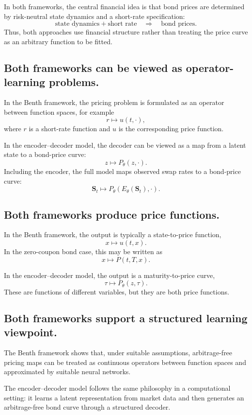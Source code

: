 In both frameworks, the central financial idea is that bond prices are determined by
risk-neutral state dynamics and a short-rate specification:
\[
    \text{state dynamics} + \text{short rate}
    \quad \Longrightarrow \quad
    \text{bond prices}.
\]
Thus, both approaches use financial structure rather than treating the price curve as
an arbitrary function to be fitted.

\subsection{Both frameworks can be viewed as operator-learning problems.}

In the Benth framework, the pricing problem is formulated as an operator between
function spaces, for example
\[
    r \longmapsto u(t,\cdot),
\]
where \(r\) is a short-rate function and \(u\) is the corresponding price function.

In the encoder--decoder model, the decoder can be viewed as a map from a latent state
to a bond-price curve:
\[
    z \longmapsto P_\theta(z,\cdot).
\]
Including the encoder, the full model maps observed swap rates to a bond-price curve:
\[
    \mathbf S_t
    \longmapsto
    P_\theta(E_\theta(\mathbf S_t),\cdot).
\]

\subsection{Both frameworks produce price functions.}

In the Benth framework, the output is typically a state-to-price function,
\[
    x \longmapsto u(t,x).
\]
In the zero-coupon bond case, this may be written as
\[
    x \longmapsto P(t,T,x).
\]

In the encoder--decoder model, the output is a maturity-to-price curve,
\[
    \tau \longmapsto P_\theta(z,\tau).
\]
These are functions of different variables, but they are both price functions.

\subsection{Both frameworks support a structured learning viewpoint.}

The Benth framework shows that, under suitable assumptions, arbitrage-free pricing
maps can be treated as continuous operators between function spaces and approximated
by suitable neural networks.

The encoder--decoder model follows the same philosophy in a computational setting:
it learns a latent representation from market data and then generates an
arbitrage-free bond curve through a structured decoder.


